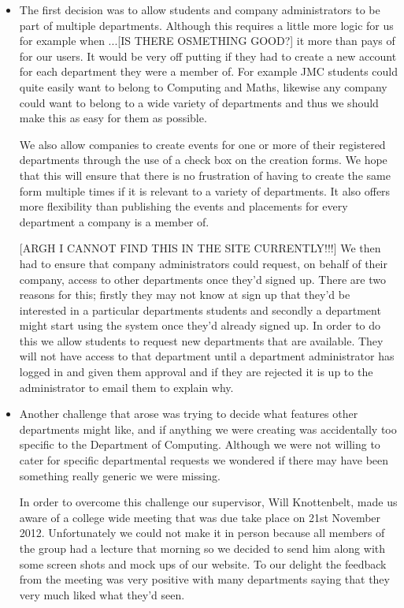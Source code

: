     \begin{itemize}
      \item  The first decision was to allow students and company administrators to be part of multiple departments. Although this requires a little more logic for us for example when ...[IS THERE OSMETHING GOOD?] it more than pays of for our users. It would be very off putting if they had to create a new account for each department they were a member of. For example JMC students could quite easily want to belong to Computing and Maths, likewise any company could want to belong to a wide variety of departments and thus we should make this as easy for them as possible.

      We also allow companies to create events for one or more of their registered departments through the use of a check box on the creation forms. We hope that this will ensure that there is no frustration of having to create the same form multiple times if it is relevant to a variety of departments. It also offers more flexibility than publishing the events and placements for every department a company is a member of.

      [ARGH I CANNOT FIND THIS IN THE SITE CURRENTLY!!!]
      We then had to ensure that company administrators could request, on behalf of their company, access to other departments once they'd signed up. There are two reasons for this; firstly they may not know at sign up that they'd be interested in a particular departments students and secondly a department might start using the system once they'd already signed up. In order to do this we allow students to request new departments that are available. They will not have access to that department until a department administrator has logged in and given them approval and if they are rejected it is up to the administrator to email them to explain why. 
      
      \item Another challenge that arose was trying to decide what features other departments might like, and if anything we were creating was accidentally too specific to the Department of Computing. Although we were not willing to cater for specific departmental requests we wondered if there may have been something really generic we were missing.

      In order to overcome this challenge our supervisor, Will Knottenbelt, made us aware of a college wide meeting that was due take place on 21st November 2012. Unfortunately we could not make it in person because all members of the group had a lecture that morning so we decided to send him along with some screen shots and mock ups of our website. To our delight the feedback from the meeting was very positive with many departments saying that they very much liked what they'd seen. 
      

\end{itemize}
